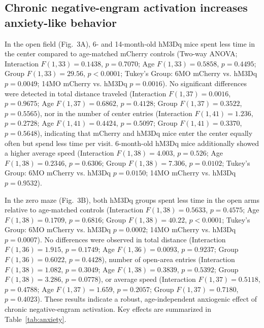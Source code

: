 \documentclass[11pt]{article}
\begin{document}
\subsection{Chronic negative-engram activation increases anxiety-like behavior}
In the open field (Fig.~3A), 6- and 14-month-old hM3Dq mice spent less time in the center compared to age-matched mCherry controls (Two-way ANOVA; Interaction $F(1,33)=0.1438$, $p=0.7070$; Age $F(1,33)=0.5858$, $p=0.4495$; Group $F(1,33)=29.56$, $p<0.0001$; Tukey's Group: 6MO mCherry vs. hM3Dq $p=0.0049$; 14MO mCherry vs. hM3Dq $p=0.0016$). No significant differences were detected in total distance traveled (Interaction $F(1,37)=0.0016$, $p=0.9675$; Age $F(1,37)=0.6862$, $p=0.4128$; Group $F(1,37)=0.3522$, $p=0.5565$), nor in the number of center entries (Interaction $F(1,41)=1.236$, $p=0.2728$; Age $F(1,41)=0.4424$, $p=0.5097$; Group $F(1,41)=0.3370$, $p=0.5648$), indicating that mCherry and hM3Dq mice enter the center equally often but spend less time per visit. 6-month-old hM3Dq mice additionally showed a higher average speed (Interaction $F(1,38)=4.003$, $p=0.526$; Age $F(1,38)=0.2346$, $p=0.6306$; Group $F(1,38)=7.306$, $p=0.0102$; Tukey's Group: 6MO mCherry vs. hM3Dq $p=0.0150$; 14MO mCherry vs. hM3Dq $p=0.9532$).

In the zero maze (Fig.~3B), both hM3Dq groups spent less time in the open arms relative to age-matched controls (Interaction $F(1,38)=0.5633$, $p=0.4575$; Age $F(1,38)=0.1709$, $p=0.6816$; Group $F(1,38)=40.22$, $p<0.0001$; Tukey's Group: 6MO mCherry vs. hM3Dq $p=0.0002$; 14MO mCherry vs. hM3Dq $p=0.0007$). No differences were observed in total distance (Interaction $F(1,36)=1.915$, $p=0.1749$; Age $F(1,36)=0.0093$, $p=0.9237$; Group $F(1,36)=0.6022$, $p=0.4428$), number of open-area entries (Interaction $F(1,38)=1.082$, $p=0.3049$; Age $F(1,38)=0.3839$, $p=0.5392$; Group $F(1,38)=3.286$, $p=0.0778$), or average speed (Interaction $F(1,37)=0.5118$, $p=0.4788$; Age $F(1,37)=1.659$, $p=0.2057$; Group $F(1,37)=0.7180$, $p=0.4023$). These results indicate a robust, age-independent anxiogenic effect of chronic negative-engram activation. Key effects are summarized in Table~\ref{tab:anxiety}.
\end{document}
